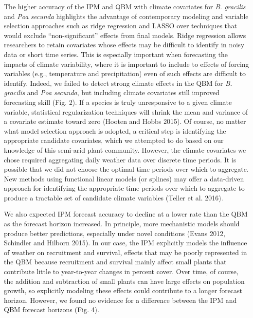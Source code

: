 \documentclass[12pt,]{article}
\begin{document}
The higher accuracy of the IPM and QBM with climate covariates for
\emph{B. gracilis} and \emph{Poa secunda} highlights the advantage of
contemporary modeling and variable selection approaches such as ridge
regression and LASSO over techniques that would exclude
``non-significant'' effects from final models. Ridge regression allows
researchers to retain covariates whose effects may be difficult to
identify in noisy data or short time series. This is especially
important when forecasting the impacts of climate variability, where it
is important to include to effects of forcing variables (e.g.,
temperature and precipitation) even of such effects are difficult to
identify. Indeed, we failed to detect strong climate effects in the QBM
for \emph{B. gracilis} and \emph{Poa secunda}, but including climate
covariates still improved forecasting skill (Fig. 2). If a species is
truly unresponsive to a given climate variable, statistical
regularization techniques will shrink the mean and variance of a
covariate estimate toward zero (Hooten and Hobbs 2015). Of course, no
matter what model selection approach is adopted, a critical step is
identifying the appropriate candidate covariates, which we attempted to
do based on our knowledge of this semi-arid plant community. However,
the climate covariates we chose required aggregating daily weather data
over discrete time periods. It is possible that we did not choose the
optimal time periods over which to aggregate. New methods using
functional linear models (or splines) may offer a data-driven approach
for identifying the appropriate time periods over which to aggregate to
produce a tractable set of candidate climate variables (Teller et al.
2016).

We also expected IPM forecast accuracy to decline at a lower rate than
the QBM as the forecast horizon increased. In principle, more
mechanistic models should produce better predictions, especially under
novel conditions (Evans 2012, Schindler and Hilborn 2015). In our case,
the IPM explicitly models the influence of weather on recruitment and
survival, effects that may be poorly represented in the QBM because
recruitment and survival mainly affect small plants that contribute
little to year-to-year changes in percent cover. Over time, of course,
the addition and subtraction of small plants can have large effects on
population growth, so explicitly modeling these effects could contribute
to a longer forecast horizon. However, we found no evidence for a
difference between the IPM and QBM forecast horizons (Fig. 4).
\end{document}
